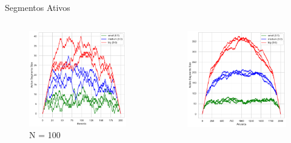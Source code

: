 \documentclass[aspectratio=169,usenames,dvipsnames]{beamer}
\begin{document}
\begin{frame}{Segmentos Ativos}

   \begin{columns}
    \begin{column}{0.5\textwidth}
      \begin{figure}
        \includegraphics[width=\textwidth]{figs/ativos/active_segments_size_100.pdf}
        \caption{N = 100}
      \end{figure}
    \end{column}
    \begin{column}{0.5\textwidth}
      \begin{figure}
        \centering
        \includegraphics[width=\textwidth]{figs/ativos/active_segments_size_1000.pdf}

\end{figure}
\end{column}
\end{columns}
\end{frame}
\end{document}

